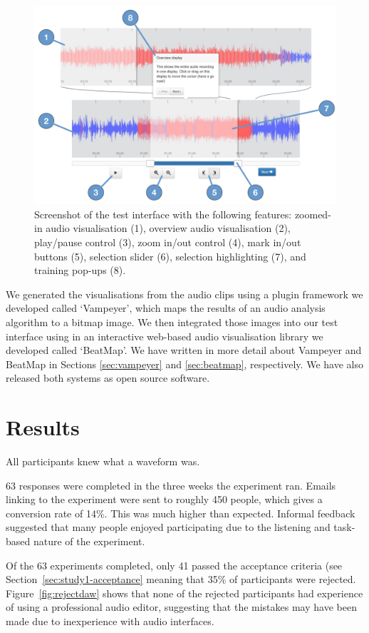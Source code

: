 \begin{figure}[ht]
\centering
\includegraphics[width=\columnwidth]{figs/browser-audio-interface.pdf}
\caption{Screenshot of the test interface with the following features:
zoomed-in audio visualisation (1),
overview audio visualisation (2),
play/pause control (3),
zoom in/out control (4),
mark in/out buttons (5),
selection slider (6),
selection highlighting (7),
and training pop-ups (8).}
\label{fig:visualisation-interface}
\end{figure}

We generated the visualisations from the audio clips using a plugin framework we developed called `Vampeyer', which
maps the results of an audio analysis algorithm to a bitmap image. We then integrated those images into our test
interface using in an interactive web-based audio visualisation library we developed called `BeatMap'.  We have written
in more detail about Vampeyer and BeatMap in Sections \ref{sec:vampeyer} and \ref{sec:beatmap}, respectively. We have
also released both systems as open source software.

\section{Results}
All participants knew what a waveform was.

63 responses were completed in the three weeks the experiment ran. Emails linking to the experiment were sent to
roughly 450 people, which gives a conversion rate of 14\%. This was much higher than expected. Informal feedback
suggested that many people enjoyed participating due to the listening and task-based nature of the experiment. 

Of the 63 experiments completed, only 41 passed the acceptance criteria (see Section~\ref{sec:study1-acceptance}
meaning that 35\% of participants were rejected. Figure~\ref{fig:rejectdaw} shows that none of the rejected
participants had experience of using a professional audio editor, suggesting that the mistakes may have been made due
to inexperience with audio interfaces.

